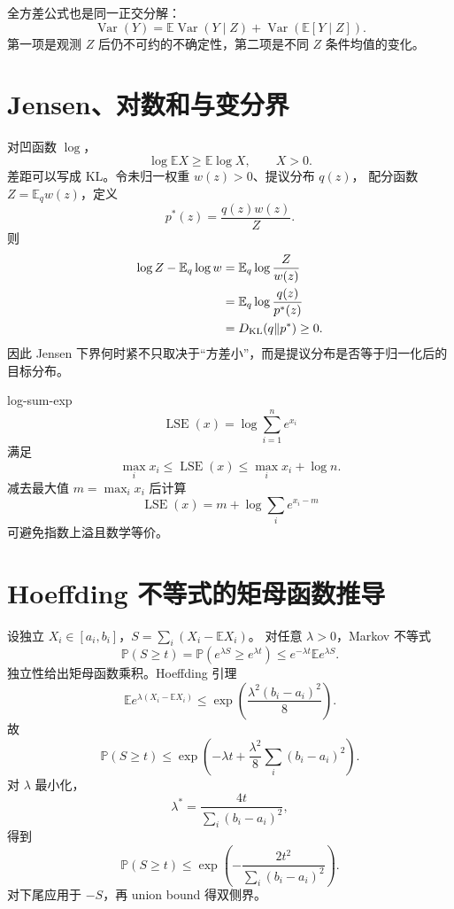 \documentclass[11pt]{article}
\numberwithin{equation}{section}
\newcommand{\E}{\mathbb{E}}
\newcommand{\Pp}{\mathbb{P}}
\newcommand{\1}{\mathbf{1}}
\newcommand{\Var}{\operatorname{Var}}
\begin{document}
全方差公式也是同一正交分解：
\begin{equation}
 \Var(Y)=\E\Var(Y\mid Z)+\Var(\E[Y\mid Z]).
\end{equation}
第一项是观测 $Z$ 后仍不可约的不确定性，第二项是不同 $Z$ 条件均值的变化。

\section{Jensen、对数和与变分界}

对凹函数 $\log$，
\begin{equation}
 \log\E X\ge\E\log X,
 \qquad X>0.
\end{equation}
差距可以写成 KL。令未归一权重 $w(z)>0$、提议分布 $q(z)$，
配分函数 $Z=\E_qw(z)$，定义
\begin{equation}
 p^*(z)=\frac{q(z)w(z)}{Z}.
\end{equation}
则
\begin{align}
 \log Z-\E_q\log w
 &=\E_q\log\frac{Z}{w(z)}\\
 &=\E_q\log\frac{q(z)}{p^*(z)}\\
 &=D_{\rm KL}(q\|p^*)\ge0.
\end{align}
因此 Jensen 下界何时紧不只取决于“方差小”，而是提议分布是否等于归一化后的目标分布。

log-sum-exp
\begin{equation}
 \operatorname{LSE}(x)=\log\sum_{i=1}^{n}e^{x_i}
\end{equation}
满足
\begin{equation}
 \max_i x_i\le\operatorname{LSE}(x)
 \le\max_i x_i+\log n.
\end{equation}
减去最大值 $m=\max_ix_i$ 后计算
\begin{equation}
 \operatorname{LSE}(x)=m+\log\sum_ie^{x_i-m}
\end{equation}
可避免指数上溢且数学等价。

\section{Hoeffding 不等式的矩母函数推导}

设独立 $X_i\in[a_i,b_i]$，$S=\sum_i(X_i-\E X_i)$。
对任意 $\lambda>0$，Markov 不等式
\begin{equation}
 \Pp(S\ge t)=\Pp(e^{\lambda S}\ge e^{\lambda t})
 \le e^{-\lambda t}\E e^{\lambda S}.
\end{equation}
独立性给出矩母函数乘积。Hoeffding 引理
\begin{equation}
 \E e^{\lambda(X_i-\E X_i)}
 \le\exp\left(\frac{\lambda^2(b_i-a_i)^2}{8}\right).
\end{equation}
故
\begin{equation}
 \Pp(S\ge t)
 \le\exp\left(-\lambda t+\frac{\lambda^2}{8}
 \sum_i(b_i-a_i)^2\right).
\end{equation}
对 $\lambda$ 最小化，
\begin{equation}
 \lambda^*=\frac{4t}{\sum_i(b_i-a_i)^2},
\end{equation}
得到
\begin{equation}
 \Pp(S\ge t)
 \le\exp\left(-\frac{2t^2}{\sum_i(b_i-a_i)^2}\right).
\end{equation}
对下尾应用于 $-S$，再 union bound 得双侧界。
\end{document}
